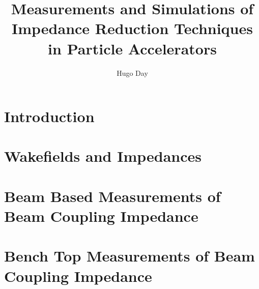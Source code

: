 \documentclass[12pt,PhD]{Thesis}
\begin{document}
%
\title{Measurements and Simulations of Impedance Reduction Techniques in Particle Accelerators}
\author{Hugo Day}


\beforeabstract
{}

\afterabstract





\afterpreface


%
%
%


\chapter{Introduction}




\chapter{Wakefields and Impedances}








\chapter{Beam Based Measurements of Beam Coupling Impedance}



\chapter{Bench Top Measurements of Beam Coupling Impedance}



\end{document}
